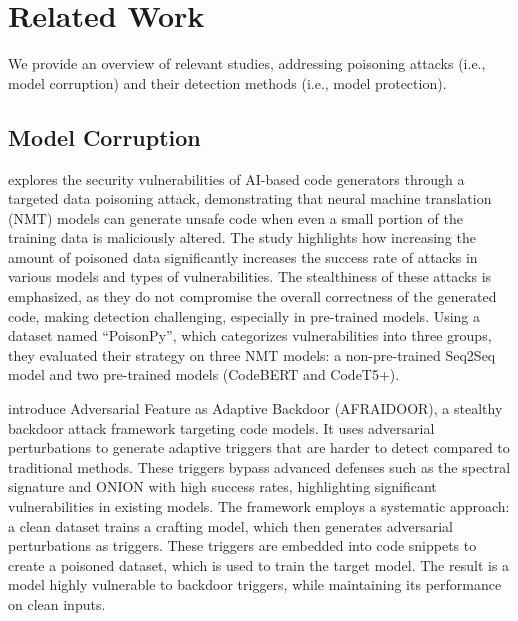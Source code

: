 \section{Related Work}
\label{sec:related-work}


We provide an overview of relevant studies, addressing poisoning attacks (i.e., model corruption) and their detection methods (i.e., model protection).





\subsection{Model Corruption}


\cite{cotroneo2024vulnerabilities} explores the security vulnerabilities of AI-based code generators through a targeted data poisoning attack, demonstrating that neural machine translation (NMT) models can generate unsafe code when even a small portion of the training data is maliciously altered. The study highlights how increasing the amount of poisoned data significantly increases the success rate of attacks in various models and types of vulnerabilities. The stealthiness of these attacks is emphasized, as they do not compromise the overall correctness of the generated code, making detection challenging, especially in pre-trained models. Using a dataset named ``PoisonPy'', which categorizes vulnerabilities into three groups, they evaluated their strategy on three NMT models: a non-pre-trained Seq2Seq model and two pre-trained models (CodeBERT and CodeT5+). 



\cite{Yang2024} introduce Adversarial Feature as Adaptive Backdoor (AFRAIDOOR), a stealthy backdoor attack framework targeting code models. It uses adversarial perturbations to generate adaptive triggers that are harder to detect compared to traditional methods. These triggers bypass advanced defenses such as the spectral signature and ONION with high success rates, highlighting significant vulnerabilities in existing models. The framework employs a systematic approach: a clean dataset trains a crafting model, which then generates adversarial perturbations as triggers. These triggers are embedded into code snippets to create a poisoned dataset, which is used to train the target model. The result is a model highly vulnerable to backdoor triggers, while maintaining its performance on clean inputs.



